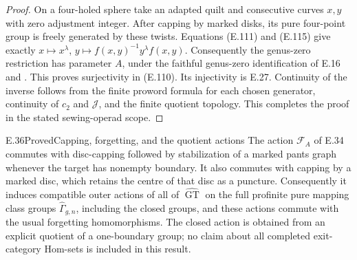 \begin{proof}
On a four-holed sphere take an adapted
quilt and consecutive curves $x,y$ with
zero adjustment integer.  After capping
by marked disks, its pure four-point
group is freely generated by these
twists.  Equations (E.111) and (E.115)
give exactly
$x\mapsto x^\lambda$,
$y\mapsto f(x,y)^{-1}y^\lambda f(x,y)$.
Consequently the genus-zero restriction
has parameter $A$, under the faithful
genus-zero identification of E.16 and
\cite[Proposition 4.7]{ET_BonattoRobertson2026}.
This proves surjectivity in (E.110).
Its injectivity is E.27.
Continuity of the inverse follows from
the finite proword formula for each
chosen generator, continuity of
$c_2$ and $\mathcal J$, and the finite
quotient topology.  This completes the
proof in the stated sewing-operad scope.
\end{proof}

\begin{result}{E.36}{Proved}{Capping, forgetting, and the quotient actions}
The action $\mathcal F_A$ of E.34 commutes with
disc-capping followed by stabilization of a
marked pants graph whenever the target has
nonempty boundary.  It also commutes with
capping by a marked disc, which retains the
centre of that disc as a puncture.
Consequently it induces compatible outer
actions of all of $\widehat{\operatorname{GT}}$
on the full profinite pure mapping class
groups $\widehat\Gamma_{g,n}$, including the
closed groups, and these actions commute
with the usual forgetting homomorphisms.
The closed action is obtained from an
explicit quotient of a one-boundary group;
no claim about all completed exit-category
Hom-sets is included in this result.
\end{result}
